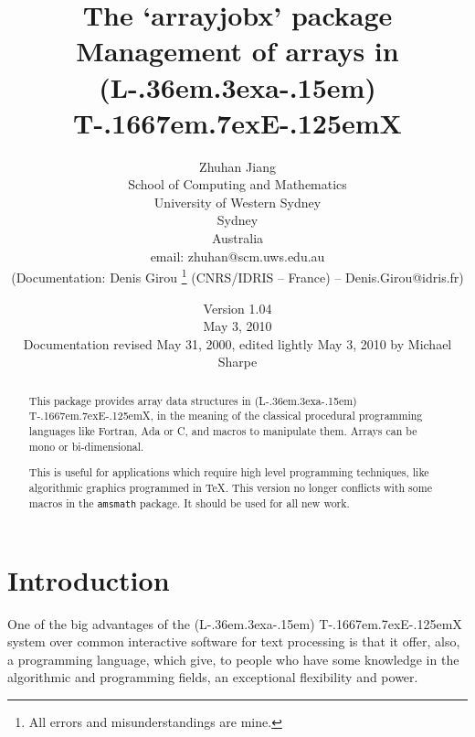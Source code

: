 \documentclass{article}
\newcommand{\AllTeX}{%
{\rm(L\kern-.36em\raise.3ex\hbox{\sc a}\kern-.15em)%
T\kern-.1667em\lower.7ex\hbox{E}\kern-.125emX}}
\newcommand{\ArrayJobPackage}{`\textsf{arrayjobx}'}
\begin{document}
\title{The \ArrayJobPackage{} package\\Management of arrays in \AllTeX}
\author{Zhuhan Jiang\\School of Computing and Mathematics\\
        University of Western Sydney\\Sydney\\Australia\\
        {\footnotesize email: zhuhan@scm.uws.edu.au}\\[5mm]
        {\footnotesize (Documentation: Denis Girou%
                       \footnote{All errors and misunderstandings are mine.}
                       \hspace{1mm}(CNRS/IDRIS -- France) --
                       Denis.Girou@idris.fr)}}
\date{Version 1.04\\May 3, 2010\\
      {\small Documentation revised May 31, 2000, edited lightly May 3, 2010 by Michael Sharpe}}

\maketitle

\begin{abstract}
  This package provides array data structures in \AllTeX, in the meaning of
the classical procedural programming languages like Fortran, Ada or C, and
macros to manipulate them. Arrays can be mono or bi-dimensional.

  This is useful for applications which require high level programming
techniques, like algorithmic graphics programmed in \TeX. This version no longer conflicts with some macros in the {\tt amsmath} package. It should be used for all new work.
\end{abstract}

\tableofcontents

\section{Introduction}

  One of the big advantages of the \AllTeX{} system over common interactive
software for text processing is that it offer, also, a programming language,
which give, to people who have some knowledge in the algorithmic and
programming fields, an exceptional flexibility and power.
\end{document}
